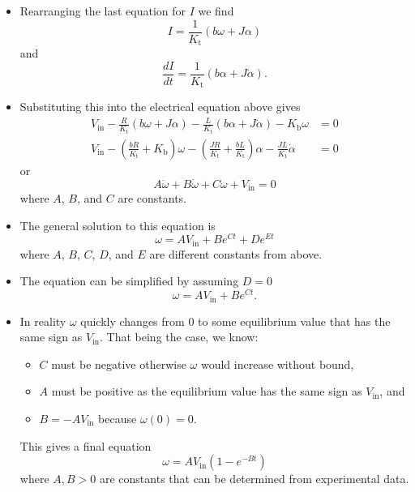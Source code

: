 \documentclass{article}
\begin{document}
\begin{itemize}
  \item Rearranging the last equation for $I$ we find \[I = \frac{1}{K_\text{t}} (b \omega + J \alpha)\] and \[\frac{d I}{d t} = \frac{1}{K_\text{t}} (b \alpha + J \dot{\alpha}).\]

  \item Substituting this into the electrical equation above gives \begin{align*}
          V_\text{in} - \frac{R}{K_\text{t}} (b \omega + J \alpha) - \frac{L}{K_\text{t}} (b \alpha + J \dot{\alpha}) - K_\text{b} \omega                                                       & = 0 \\
          V_\text{in} - \left( \frac{b R}{K_\text{t}} + K_\text{b} \right) \omega - \left( \frac{J R}{K_\text{t}} + \frac{b L}{K_\text{t}} \right) \alpha - \frac{J L}{K_\text{t}} \dot{\alpha} & = 0
        \end{align*} or \[A \ddot{\omega} + B \dot{\omega} + C \omega + V_\text{in} = 0\] where $A$, $B$, and $C$ are constants.

  \item The general solution to this equation is \[\omega = A V_\text{in} + B e^{C t} + D e^{E t}\] where $A$, $B$, $C$, $D$, and $E$ are different constants from above.

  \item The equation can be simplified by assuming $D = 0$ \[\omega = A V_\text{in} + B e^{C t}.\]

  \item In reality $\omega$ quickly changes from $0$ to some equilibrium value that has the same sign as $V_\text{in}$. That being the case, we know:

        \begin{itemize}
          \item $C$ must be negative otherwise $\omega$ would increase without bound,

          \item $A$ must be positive as the equilibrium value has the same sign as $V_\text{in}$, and

          \item $B = -A V_\text{in}$ because $\omega(0) = 0$.
        \end{itemize}

        This gives a final equation \[\omega = A V_\text{in} (1 - e^{-B t})\] where $A, B > 0$ are constants that can be determined from experimental data.
\end{itemize}
\end{document}
